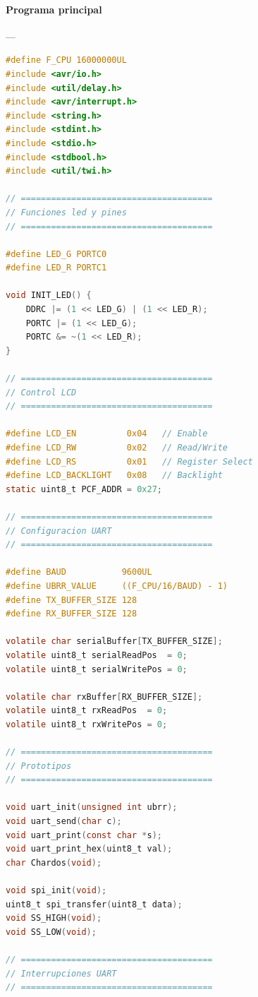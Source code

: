 \paragraph{Programa principal}\label{anexo:codigo_cerradura}---\\
\begin{lstlisting}[language=C, caption={Programa principal del sistema de cerradura en Proteus.}]
#define F_CPU 16000000UL
#include <avr/io.h>
#include <util/delay.h>
#include <avr/interrupt.h>
#include <string.h>
#include <stdint.h>
#include <stdio.h>
#include <stdbool.h>
#include <util/twi.h>

// ======================================
// Funciones led y pines
// ======================================

#define LED_G PORTC0
#define LED_R PORTC1

void INIT_LED() {
    DDRC |= (1 << LED_G) | (1 << LED_R);
    PORTC |= (1 << LED_G);
    PORTC &= ~(1 << LED_R);
}

// ======================================
// Control LCD
// ======================================

#define LCD_EN          0x04   // Enable
#define LCD_RW          0x02   // Read/Write
#define LCD_RS          0x01   // Register Select
#define LCD_BACKLIGHT   0x08   // Backlight
static uint8_t PCF_ADDR = 0x27;

// ======================================
// Configuracion UART
// ======================================

#define BAUD           9600UL
#define UBRR_VALUE     ((F_CPU/16/BAUD) - 1)
#define TX_BUFFER_SIZE 128
#define RX_BUFFER_SIZE 128

volatile char serialBuffer[TX_BUFFER_SIZE];
volatile uint8_t serialReadPos  = 0;
volatile uint8_t serialWritePos = 0;

volatile char rxBuffer[RX_BUFFER_SIZE];
volatile uint8_t rxReadPos  = 0;
volatile uint8_t rxWritePos = 0;

// ======================================
// Prototipos
// ======================================

void uart_init(unsigned int ubrr);
void uart_send(char c);
void uart_print(const char *s);
void uart_print_hex(uint8_t val);
char Chardos(void);

void spi_init(void);
uint8_t spi_transfer(uint8_t data);
void SS_HIGH(void);
void SS_LOW(void);

// ======================================
// Interrupciones UART
// ======================================


\end{lstlisting}
